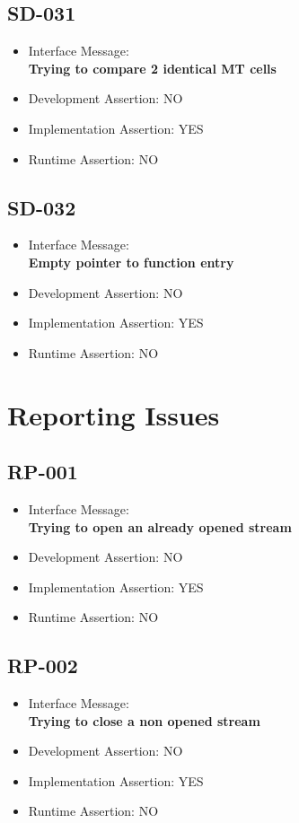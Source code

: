 \subsection{SD-031}
\begin{itemize}
  \item Interface Message:\\[1em]\textbf{Trying to compare 2 identical MT cells}
  \item Development Assertion: NO
  \item Implementation Assertion: YES
  \item Runtime Assertion: NO
\end{itemize}

\subsection{SD-032}
\begin{itemize}
  \item Interface Message:\\[1em]\textbf{Empty pointer to function entry}
  \item Development Assertion: NO
  \item Implementation Assertion: YES
  \item Runtime Assertion: NO
\end{itemize}

\section{Reporting Issues}

\subsection{RP-001}
\begin{itemize}
  \item Interface Message:\\[1em]\textbf{Trying to open an already opened stream}
  \item Development Assertion: NO
  \item Implementation Assertion: YES
  \item Runtime Assertion: NO
\end{itemize}

\subsection{RP-002}
\begin{itemize}
  \item Interface Message:\\[1em]\textbf{Trying to close a non opened stream}
  \item Development Assertion: NO
  \item Implementation Assertion: YES
  \item Runtime Assertion: NO
\end{itemize}

